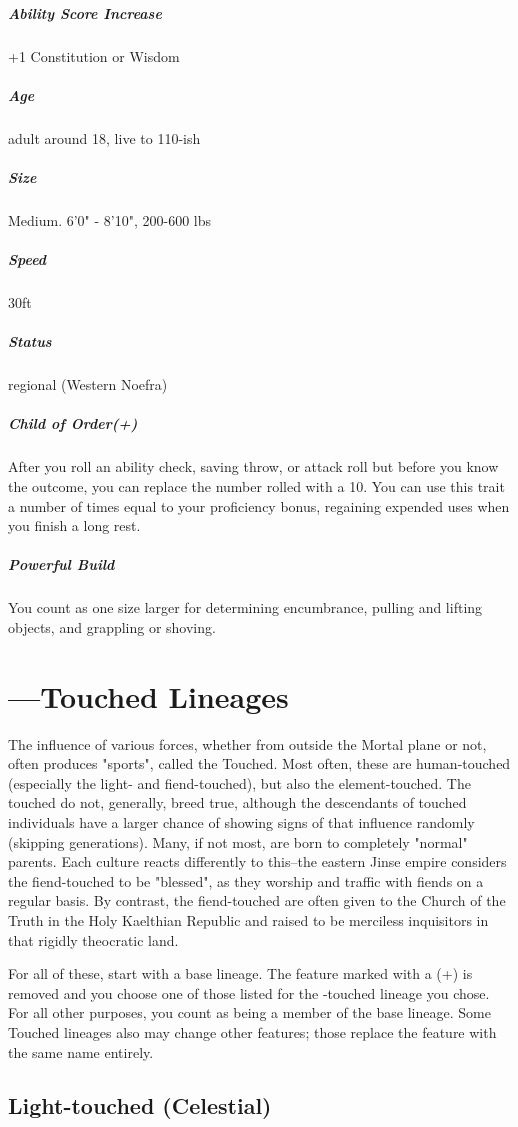 \subparagraph*{Ability Score Increase}  +1 Constitution or Wisdom

\subparagraph*{Age}  adult around 18, live to 110-ish

\subparagraph*{Size}  Medium. 6'0" - 8'10", 200-600 lbs

\subparagraph*{Speed}  30ft

\subparagraph*{Status}  regional (Western Noefra)

\subparagraph*{Child of Order(+)}  After you roll an ability check, saving throw, or attack roll but before you know the outcome, you can replace the number rolled with a 10. You can use this trait a number of times equal to your proficiency bonus, regaining expended uses when you finish a long rest.

\subparagraph*{Powerful Build}  You count as one size larger for determining encumbrance, pulling and lifting objects, and grappling or shoving.

\section{---Touched Lineages}
The influence of various forces, whether from outside the Mortal plane or not, often produces "sports", called the Touched. Most often, these are human-touched (especially the light- and fiend-touched), but also the element-touched. The touched do not, generally, breed true, although the descendants of touched individuals have a larger chance of showing signs of that influence randomly (skipping generations). Many, if not most, are born to completely "normal" parents. Each culture reacts differently to this--the eastern Jinse empire considers the fiend-touched to be "blessed", as they worship and traffic with fiends on a regular basis. By contrast, the fiend-touched are often given to the Church of the Truth in the Holy Kaelthian Republic and raised to be merciless inquisitors in that rigidly theocratic land.

For all of these, start with a base lineage. The feature marked with a (+) is removed and you choose one of those listed for the -touched lineage you chose. For all other purposes, you count as being a member of the base lineage. Some Touched lineages also may change other features; those replace the feature with the same name entirely.

\subsection{Light-touched (Celestial)}

